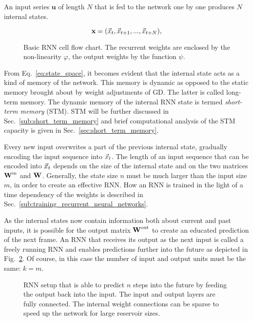 An input series $\mathbf{u}$ of length $N$ that is fed to the network one by
one produces $N$ internal states.

\begin{equation}
  \mathbf{x} = (\vec{x}_t, \vec{x}_{t+1}, ..., \vec{x}_{t+N}),
\end{equation}
\begin{figure}
  \centering
  \RNNFlowChart
  \caption{Basic RNN cell flow chart. The recurrent weights are enclosed by the
  non-linearity $\varphi$, the output weights by the function $\psi$.}
  \label{fig:rnn_flow_chart}
\end{figure}



From Eq.~\ref{eq:state_space}, it becomes evident that the internal state acts
as a kind of memory of the network.  This memory is dynamic as opposed to the
static memory brought about by weight adjustments of GD.  The latter is called
long-term memory. The dynamic memory of the internal RNN state is termed
\emph{short-term memory} (STM). STM will be further discussed in
Sec.~\ref{sub:short_term_memory}  and brief computational analysis of the STM
capacity is given in Sec.~\ref{sec:short_term_memory}. 

Every new input overwrites a part of the previous internal state, gradually
encoding the input sequence into $\vec{x}_t$.  The length of an input sequence
that can be encoded into $\vec{x}_t$ depends on the size of the internal state and
on the two matrices $\boldsymbol{\textbf{W}}^{\text{in}}$ and $\boldsymbol{\textbf{W}}^{\text{}}$.  Generally, the state size $n$
must be much larger than the input size $m$, in order to create an effective
RNN. How an RNN is trained in the light of a time dependency of the weights is
described in Sec.~\ref{sub:training_recurrent_neural_networks}.

As the internal states now contain information both about current and past
inputs, it is possible for the output matrix $\boldsymbol{\textbf{W}}^{\text{out}}$ to create an educated
prediction of the next frame.  An RNN that receives its output as the next
input is called a freely running RNN and enables predictions further into the
future as depicted in Fig.~\ref{fig:annotated_rnn}.  Of course, in this case the
number of input and output units must be the same: $k = m$.

\begin{figure}
  \centering
  \RecurrentNetAnnotated
  \caption{RNN setup that is able to predict $n$ steps into the future by
    feeding the output back into the input. The input and output layers are
    fully connected. The internal weight connections can be sparse to speed
    up the network for large reservoir sizes.
  }
  \label{fig:annotated_rnn}
\end{figure}



